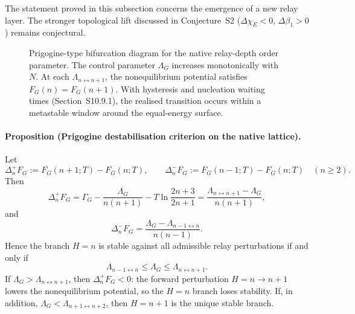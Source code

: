 \documentclass[11pt]{article}
\begin{document}
The statement proved in this subsection concerns the emergence of a new
relay layer.
The stronger topological lift discussed in Conjecture~S2
($\Delta\chi_E<0$, $\Delta\beta_1>0$)
remains conjectural.

\begin{figure}[H]
\centering
{}
\caption{Prigogine-type bifurcation diagram for the native relay-depth order
parameter.  The control parameter $\Lambda_G$ increases monotonically with
$N$.  At each $\Lambda_{n\leftrightarrow n+1}$, the nonequilibrium
potential satisfies $F_G(n)=F_G(n+1)$.  With hysteresis and nucleation
waiting times (Section~S10.9.1), the realised transition occurs within a
metastable window around the equal-energy surface.}
\label{fig:S10_prigogine_bifurcation}
\end{figure}

\paragraph{Proposition (Prigogine destabilisation criterion on the native lattice).}
\label{prop:prigogine_destab}
Let
\[
\Delta_n^+F_G:=F_G(n+1;T)-F_G(n;T),\qquad
\Delta_n^-F_G:=F_G(n-1;T)-F_G(n;T)\quad (n\ge2).
\]
Then
\[
\Delta_n^+F_G=\Gamma_G-\frac{\Lambda_G}{n(n+1)}-T\ln\frac{2n+3}{2n+1}
  =\frac{\Lambda_{n\leftrightarrow n+1}-\Lambda_G}{n(n+1)},
\]
and
\[
\Delta_n^-F_G=\frac{\Lambda_G-\Lambda_{n-1\leftrightarrow n}}{n(n-1)}.
\]
Hence the branch $H=n$ is stable against all admissible relay perturbations
if and only if
\[
\Lambda_{n-1\leftrightarrow n}\le \Lambda_G \le \Lambda_{n\leftrightarrow n+1}.
\]
If $\Lambda_G>\Lambda_{n\leftrightarrow n+1}$, then $\Delta_n^+F_G<0$:
the forward perturbation $H=n\to n+1$ lowers the nonequilibrium potential,
so the $H=n$ branch loses stability.
If, in addition,
$\Lambda_G<\Lambda_{n+1\leftrightarrow n+2}$,
then $H=n+1$ is the unique stable branch.
\end{document}
